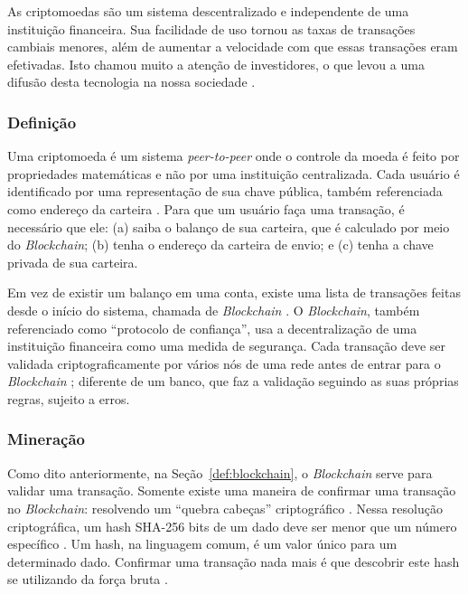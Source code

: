 \documentclass[
article,			%
12pt,				%
openright,			%
oneside,			%
a4paper,			%
chapter=TITLE,		%
section=TITLE,		%
subsection=TITLE,	%
subsubsection=TITLE,%
subsubsubsection=TITLE, %
english,			%
brazil,				%
]{abntex2}
\begin{document}
As criptomoedas são um sistema descentralizado e independente de uma
instituição financeira. Sua facilidade de uso tornou as taxas de
transações cambiais menores, além de aumentar a velocidade com que
essas transações eram efetivadas. Isto chamou muito a atenção de
investidores, o que levou a uma difusão desta tecnologia na nossa
sociedade \cite{Nakamoto2008, Prado2017}.

\subsubsection{Definição}

Uma criptomoeda é um sistema \emph{peer-to-peer} onde o controle da
moeda é feito por propriedades matemáticas e não por uma instituição
centralizada. Cada usuário é identificado por uma representação de sua
chave pública, também referenciada como endereço da carteira
\cite{Weber2012}. Para que um usuário faça uma transação, é necessário
que ele: (a) saiba o balanço de sua carteira, que é calculado por meio
do \emph{Blockchain}; (b) tenha o endereço da carteira de envio; e (c)
tenha a chave privada de sua carteira.

Em vez de existir um balanço em uma conta, existe uma lista de
transações feitas desde o início do sistema, chamada de
\emph{Blockchain} \cite{Weber2012}\label{def:blockchain}. O
\emph{Blockchain}, também referenciado como ``protocolo de
confiança'', usa a decentralização de uma instituição financeira como
uma medida de segurança. Cada transação deve ser validada
criptograficamente por vários nós de uma rede antes de entrar para o
\emph{Blockchain} \cite{LChicarino}; diferente de um banco, que faz a
validação seguindo as suas próprias regras, sujeito a erros.

\subsubsection{Mineração}

Como dito anteriormente, na Seção~\ref{def:blockchain}, o
\emph{Blockchain} serve para validar uma transação. Somente existe uma
maneira de confirmar uma transação no \emph{Blockchain}: resolvendo um
``quebra cabeças'' criptográfico \cite{Weber2012}. Nessa resolução
criptográfica, um hash SHA-256 bits de um dado deve ser menor que um
número específico \cite{Dev2014}. Um hash, na linguagem comum, é um
valor único para um determinado dado.  Confirmar uma transação nada
mais é que descobrir este hash se utilizando da força bruta
\cite{Arsov}.
\end{document}
